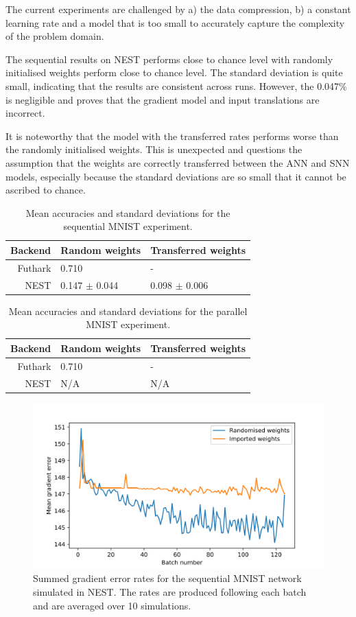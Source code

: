 \documentclass[report.tex]{subfiles}
\begin{document}
The current experiments are challenged by a) the data compression, b) a constant
learning rate and a model that is too small to accurately capture the complexity
of the problem domain.

The sequential results on NEST performs close to chance level with randomly
initialised weights perform close to chance level.
The standard deviation is quite small, indicating that the results are
consistent across runs.
However, the 0.047\% is negligible and proves that the gradient model
and input translations are incorrect.

It is noteworthy that the model with the transferred rates performs worse than
the randomly initialised weights.
This is unexpected and questions the assumption that the weights are correctly
transferred between the \gls{ANN} and \gls{SNN} models, especially because the
standard deviations are so small that it cannot be ascribed to chance.

\begin{table}
  \begin{tabular}{r l l}
  Backend & Random weights & Transferred weights \\ \hline
  Futhark & 0.710 & - \\ 
  NEST & 0.147 $\pm$ 0.044 & 0.098 $\pm$ 0.006 \\
  \end{tabular}
  \caption{Mean accuracies and standard deviations for the sequential MNIST experiment.}
  \label{tab:mnist_seq}
\end{table}

\begin{table}
  \begin{tabular}{r l l}
  Backend & Random weights & Transferred weights \\ \hline
  Futhark & 0.710 & - \\ 
  NEST & N/A & N/A \\
  \end{tabular}
  \caption{Mean accuracies and standard deviations for the parallel MNIST experiment.}
  \label{tab:mnist_par}
\end{table}

\begin{figure}
  \includegraphics[width=\linewidth]{images/mnist_snn.png}
  \caption{Summed gradient error rates for the sequential MNIST network simulated in NEST. The rates
  are produced following each batch and are averaged over 10 simulations.}
  \label{fig:mnist_snn}
\end{figure}
\FloatBarrier
\end{document}
